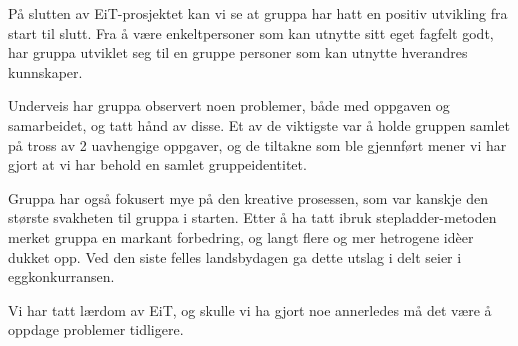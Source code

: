 

På slutten av EiT-prosjektet kan vi se at gruppa har hatt en positiv utvikling fra start til slutt.
Fra å være enkeltpersoner som kan utnytte sitt eget fagfelt godt,
har gruppa utviklet seg til en gruppe personer som kan utnytte hverandres kunnskaper.

Underveis har gruppa observert noen problemer, både med oppgaven og samarbeidet,
og tatt hånd av disse.
Et av de viktigste var å holde gruppen samlet på tross av 2 uavhengige oppgaver, 
og de tiltakne som ble gjennført mener vi har gjort at vi har behold en samlet gruppeidentitet.

Gruppa har også fokusert mye på den kreative prosessen, som var kanskje den største svakheten til gruppa i starten.
Etter å ha tatt ibruk stepladder-metoden merket gruppa en markant forbedring, 
og langt flere og mer hetrogene idèer dukket opp. 
Ved den siste felles landsbydagen ga dette utslag i delt seier i eggkonkurransen.

Vi har tatt lærdom av EiT, og skulle vi ha gjort noe annerledes må det være å oppdage problemer tidligere.
